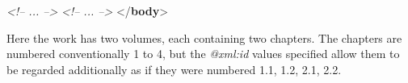 \documentclass[11pt,twoside]{article}\makeatletter
\begin{document}
\begin{shaded}
\hspace*{6pt}\mbox{}\newline 
\textit{<!-- ... -->}\mbox{}\newline 
\hspace*{6pt}\mbox{}\newline 
\hspace*{6pt}\mbox{}\newline 
\textit{<!-- ... -->}\mbox{}\newline 
\hspace*{6pt}\mbox{}\newline 
{}\mbox{}\newline 
{</\textbf{body}>}\end{shaded}\egroup\par \noindent  Here the work has two volumes, each containing two chapters. The chapters are numbered conventionally 1 to 4, but the \textit{@xml:id} values specified allow them to be regarded additionally as if they were numbered 1.1, 1.2, 2.1, 2.2.
\end{document}
